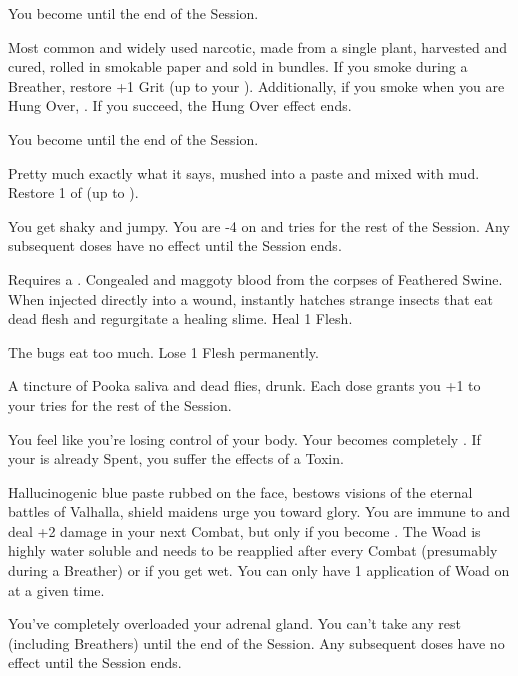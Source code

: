    You become  until the end of the Session.


  Most common and widely used narcotic, made from a single plant, harvested and cured, rolled in smokable paper and sold in bundles.  If you smoke during a Breather, restore +1 Grit (up to your \MAX).  Additionally, if you smoke when you are Hung Over, .  If you succeed, the Hung Over effect ends.

    You become  until the end of the Session.


  Pretty much exactly what it says, mushed into a paste and mixed with mud. Restore 1 \UD of \TAL (up to \MAX).

   You get shaky and jumpy. You are -4 on  \RO and \RS tries for the rest of the Session. Any subsequent doses have no effect until the Session ends.


   Requires a . Congealed and maggoty blood from the corpses of Feathered Swine. When injected directly into a wound, instantly hatches strange insects that eat dead flesh and regurgitate a healing slime.  Heal 1 Flesh.

   The bugs eat too much. Lose 1 Flesh permanently.


    A tincture of Pooka saliva and dead flies, drunk. Each dose grants you +1 to your \DEX tries for the rest of the Session.

   You feel like you're losing control of your body. Your \TAL becomes completely . If your \TAL is already Spent, you suffer the effects of a  Toxin.


\cbreak



  Hallucinogenic blue paste rubbed on the face, bestows visions of the eternal battles of Valhalla, shield maidens urge you toward glory. You are immune to  and deal +2 damage in your next Combat, but only if you become . The Woad is highly water soluble and needs to be reapplied after every Combat (presumably during a Breather) or if you get wet.  You can only have 1 application of Woad on at a given time.

   You've completely overloaded your adrenal gland. You can't take any rest (including Breathers) until the end of the Session. Any subsequent doses have no effect until the Session ends.




